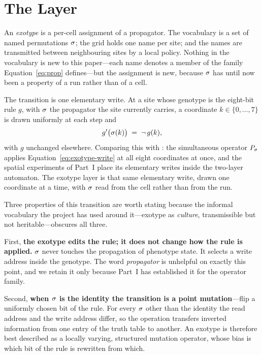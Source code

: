\section{The Layer}
\label{sec:exotype-layer}

An \emph{exotype} is a per-cell assignment of a propagator. The vocabulary is a
set of named permutations $\sigma$; the grid holds one name per site; and the
names are transmitted between neighbouring sites by a local policy. Nothing in
the vocabulary is new to this paper---each name denotes a member of the family
Equation~\eqref{eq:prop} defines---but the assignment is new, because $\sigma$ has
until now been a property of a run rather than of a cell.

The transition is one elementary write. At a site whose genotype is the
eight-bit rule $g$, with $\sigma$ the propagator the site currently carries, a
coordinate $k \in \{0,\dots,7\}$ is drawn uniformly at each step and
%
\begin{equation}
  g'\bigl(\sigma(k)\bigr) \;=\; \neg\, g(k),
  \label{eq:exotype-write}
\end{equation}
%
with $g$ unchanged elsewhere. Comparing this with : the
simultaneous operator $P_\sigma$ applies Equation~\eqref{eq:exotype-write} at all
eight coordinates at once, and the spatial experiments of Part~I place its
elementary writes inside the two-layer automaton. The exotype layer is that same
elementary write, drawn one coordinate at a time, with $\sigma$ read from the cell
rather than from the run.

Three properties of this transition are worth stating because the informal
vocabulary the project has used around it---exotype as \emph{culture},
transmissible but not heritable---obscures all three.

First, \textbf{the exotype edits the rule; it does not change how the rule is
applied.} $\sigma$ never touches the propagation of phenotype state. It selects a
write address inside the genotype. The word \emph{propagator} is unhelpful on
exactly this point, and we retain it only because Part~I has established it for
the operator family.

Second, \textbf{when $\sigma$ is the identity the transition is a point
mutation}---flip a uniformly chosen bit of the rule. For every $\sigma$ other than
the identity the read address and the write address differ, so the operation
transfers inverted information from one entry of the truth table to another.
An exotype is therefore best described as a locally varying, structured mutation
operator, whose bias is which bit of the rule is rewritten from which.

